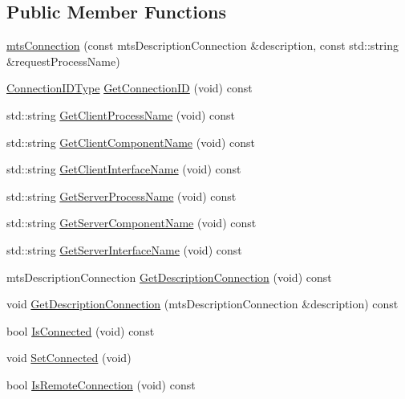 \subsection*{Public Member Functions}
\begin{DoxyCompactItemize}
\item 
\hyperlink{classmts_connection_a071972ee336069bba608bd6737251c80}{mts\+Connection} (const mts\+Description\+Connection \&description, const std\+::string \&request\+Process\+Name)
\item 
\hyperlink{mts_forward_declarations_8h_ad3543bb11742e1766374ec96016d6547}{Connection\+I\+D\+Type} \hyperlink{classmts_connection_a0cdb99db04bf430b6d66d101a06632e7}{Get\+Connection\+I\+D} (void) const 
\item 
std\+::string \hyperlink{classmts_connection_a863c48dc7afc08a3cf46daa8baefc71d}{Get\+Client\+Process\+Name} (void) const 
\item 
std\+::string \hyperlink{classmts_connection_a3121c2b3b8b866c02061f1933cb6dbb3}{Get\+Client\+Component\+Name} (void) const 
\item 
std\+::string \hyperlink{classmts_connection_a9e646b120e7922e1cc541b3cd76f8cdc}{Get\+Client\+Interface\+Name} (void) const 
\item 
std\+::string \hyperlink{classmts_connection_a7238662b0ee1b16715b154bdc3e7d2b1}{Get\+Server\+Process\+Name} (void) const 
\item 
std\+::string \hyperlink{classmts_connection_a5840d98170336716c9e12b0790807b01}{Get\+Server\+Component\+Name} (void) const 
\item 
std\+::string \hyperlink{classmts_connection_a846f0404697261cd08493abbd9fe0b23}{Get\+Server\+Interface\+Name} (void) const 
\item 
mts\+Description\+Connection \hyperlink{classmts_connection_a57ce93d13a639abfde415fce5aea3b4f}{Get\+Description\+Connection} (void) const 
\item 
void \hyperlink{classmts_connection_a8cf4f6f7a4fb474edb6a853d9365d751}{Get\+Description\+Connection} (mts\+Description\+Connection \&description) const 
\item 
bool \hyperlink{classmts_connection_ae9b6fd039a212ad72e7ccfd4a290cf25}{Is\+Connected} (void) const 
\item 
void \hyperlink{classmts_connection_ab6500a009f3f07c65be009eb7b6acd2f}{Set\+Connected} (void)
\item 
bool \hyperlink{classmts_connection_ac1299d1d2ab8168b017950fc372268f4}{Is\+Remote\+Connection} (void) const 
\item 

\end{DoxyCompactItemize}

